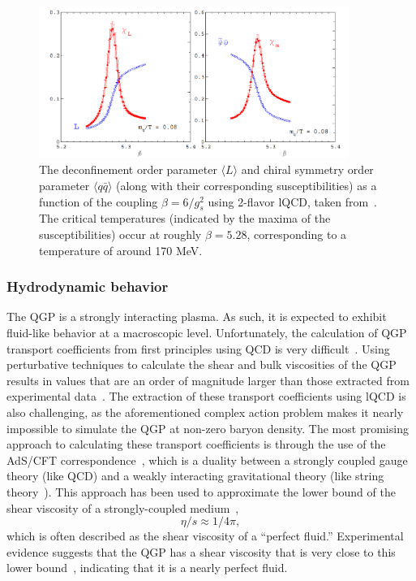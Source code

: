 \begin{figure}
    \centering
    \includegraphics[width=0.9\textwidth]{figures/introduction/phase_transition.png}
    \caption{The deconfinement order parameter $\langle L \rangle$ and chiral symmetry order parameter $\langle q\bar{q} \rangle$ (along with their corresponding susceptibilities) as a function of the coupling $\beta = 6/g_s^2$ using 2-flavor lQCD, taken from~\cite{FrithofLattice}. The critical temperatures (indicated by the maxima of the susceptibilities) occur at roughly $\beta = 5.28$, corresponding to a temperature of around 170 MeV.}
    \label{fig:order_parameters}
\end{figure}

\subsubsection{Hydrodynamic behavior}
\label{sec:qgp_fluid}

The QGP is a strongly interacting plasma. As such, it is expected to exhibit fluid-like behavior at a macroscopic level. Unfortunately, the calculation of QGP transport coefficients from first principles using QCD is very difficult~\cite{FlowViscPaper}. Using perturbative techniques to calculate the shear and bulk viscosities of the QGP results in values that are an order of magnitude larger than those extracted from experimental data~\cite{Visc1}. The extraction of these transport coefficients using lQCD is also challenging, as the aforementioned complex action problem makes it nearly impossible to simulate the QGP at non-zero baryon density. The most promising approach to calculating these transport coefficients is through the use of the AdS/CFT correspondence~\cite{AdSCFT}, which is a duality between a strongly coupled gauge theory (like QCD) and a weakly interacting gravitational theory (like string theory~\cite{StringTheory}). This approach has been used to approximate the lower bound of the shear viscosity of a strongly-coupled medium~\cite{QGPViscADS}, 
\begin{equation}
\eta/s \approx 1/4\pi,
\end{equation}
which is often described as the shear viscosity of a ``perfect fluid.'' Experimental evidence suggests that the QGP has a shear viscosity that is very close to this lower bound~\cite{QGPViscExp}, indicating that it is a nearly perfect fluid.


